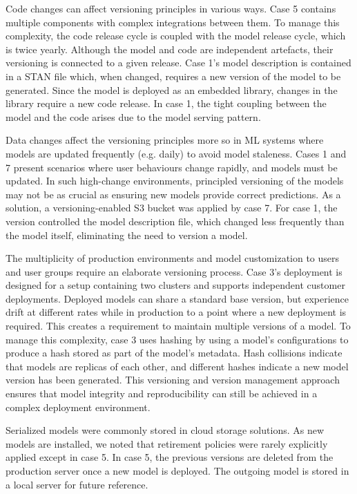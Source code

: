 Code changes can affect versioning principles in various ways. Case 5 contains multiple components with complex integrations between them. To manage this complexity, the code release cycle is coupled with the model release cycle, which is twice yearly. Although the model and code are independent artefacts, their versioning is connected to a given release. Case 1's model description is contained in a STAN file which, when changed, requires a new version of the model to be generated. Since the model is deployed as an embedded library, changes in the library require a new code release. In case 1, the tight coupling between the model and the code arises due to the model serving pattern.

Data changes affect the versioning principles more so in ML systems where models are updated frequently (e.g. daily) to avoid model staleness. Cases 1 and 7 present scenarios where user behaviours change rapidly, and models must be updated. In such high-change environments, principled versioning of the models may not be as crucial as ensuring new models provide correct predictions. As a solution, a versioning-enabled S3 bucket was applied by case 7. For case 1, the version controlled the model description file, which changed less frequently than the model itself, eliminating the need to version a model. 

The multiplicity of production environments and model customization to users and user groups require an elaborate versioning process. Case 3's deployment is designed for a setup containing two clusters and supports independent customer deployments. Deployed models can share a standard base version, but experience drift at different rates while in production to a point where a new deployment is required. This creates a requirement to maintain multiple versions of a model. To manage this complexity, case 3 uses hashing by using a model's configurations to produce a hash stored as part of the model's metadata. Hash collisions indicate that models are replicas of each other, and different hashes indicate a new model version has been generated. This versioning and version management approach ensures that model integrity and reproducibility can still be achieved in a complex deployment environment.

Serialized models were commonly stored in cloud storage solutions. As new models are installed, we noted that retirement policies were rarely explicitly applied except in case 5. In case 5, the previous versions are deleted from the production server once a new model is deployed. The outgoing model is stored in a local server for future reference.

